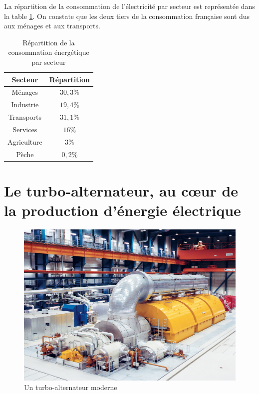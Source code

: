 \documentclass[12pt,a4paper,oneside,openany]{memoir}
\begin{document}
La répartition de la consommation de l'électricité par secteur est représentée dans la table \ref{repartition secteur}. On constate que les deux tiers de la consommation française sont dus aux ménages et aux transports.



	\begin{table}[h]
		\centering
		\begin{tabular}{cc}
			\toprule
			Secteur & Répartition\\
			\midrule
			Ménages & $30,3\%$ \\ 
			Industrie & $19,4\%$ \\ 
			Transports & $31,1\%$ \\ 
			Services & $16\%$ \\ 
			Agriculture & $3\%$ \\ 
			Pèche & $0,2\%$ \\ 
			\bottomrule
		\end{tabular} 
		\caption{Répartition de la consommation énergétique par secteur}
		\label{repartition secteur}
	\end{table}


\chapter{Le turbo-alternateur, au cœur de la production d'énergie électrique}

\begin{figure}
	\centering
	\includegraphics[width=0.95\linewidth]{img/Turbogenerator01}
	\caption{Un turbo-alternateur moderne}
	\label{fig:turbogenerator}
\end{figure}
\end{document}
